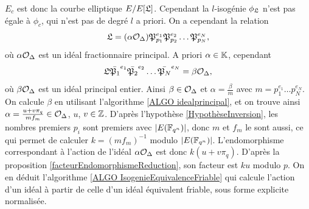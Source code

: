 $E_c$ est donc la courbe elliptique $E/E[\mathfrak{L}]$. Cependant la $l$-isogénie $\phi_{\mathfrak{L}}$ n'est pas égale à $\phi_c$, qui n'est pas de degré $l$ a priori. On a cependant la relation
\begin{equation*}
	\mathfrak{L} = (\alpha\mathcal{O}_{\Delta})\mathfrak{P}_{p_{1}}^{e_{1}}\mathfrak{P}_{p_{2}}^{e_{2}}\ldots\mathfrak{P}_{p_{N}}^{e_{N}},
\end{equation*}
où $\alpha\mathcal{O}_\Delta$ est un idéal fractionnaire principal. A priori $\alpha\in\mathbb{K}$, cependant
\begin{equation*}
	\mathfrak{L}\bar{\mathfrak{P}_{1}}^{e_{1}}\bar{\mathfrak{P}_{2}}^{e_{2}}\ldots\bar{\mathfrak{P}_{N}}^{e_{N}} = \beta\mathcal{O}_{\Delta},
\end{equation*}
où $\beta\mathcal{O}_{\Delta}$ est un idéal principal entier. Ainsi $\beta\in\mathcal{O}_{\Delta}$ et $\alpha = \frac{\beta}{m}$ avec $m = p_1^{e_1}\ldots p_N^{e_N}$. On calcule $\beta$ en utilisant l'algorithme \ref{ALGO idealprincipal}, et on trouve ainsi $\alpha = \frac{u + v\pi_{q}}{mf_{m}}\in\mathcal{O}_{\Delta}$, $u$, $v\in\mathbb{Z}$. D'après l'hypothèse \ref{HypothèseInversion}, les nombres premiers $p_{i}$ sont premiers avec $|E(\mathbb{F}_{q^{n}})|$, donc $m$ et $f_{m}$ le sont aussi, ce qui permet de calculer $k = (mf_{m})^{-1}$ modulo $|E(\mathbb{F}_{q^{n}})|$. L'endomorphisme correspondant à l'action de l'idéal $\alpha\mathcal{O}_{\Delta}$ est donc $k(u + v\pi_{q})$. D'après la proposition \ref{facteurEndomorphismeReduction}, son facteur est $ku$ modulo $p$. On en déduit l'algorithme \ref{ALGO IsogenieEquivalenceFriable} qui calcule l'action d'un idéal à partir de celle d'un idéal équivalent friable, sous forme explicite normalisée. 

